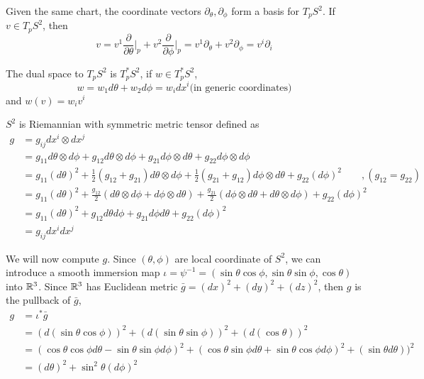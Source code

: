 \documentclass[12pt]{article}
\begin{document}
Given the same chart, the coordinate vectors $\partial_\theta, \partial_\phi$ form a basis for $T_pS^2$. If $v \in T_pS^2$, then  $$v = v^1 \frac{\partial}{\partial \theta}\bigg\rvert_p + v^2 \frac{\partial}{\partial \phi}\bigg\rvert_p = v^1\partial_\theta + v^2 \partial_\phi = v^i \partial_i $$

The dual space to $T_pS^2$ is $T^*_pS^2$, if $w \in T^*_pS^2$, $$w = w_1 d\theta + w_2 d\phi = w_i dx^i \text{(in generic coordinates)}$$
and $w(v) = w_i v^i$

$S^2$ is Riemannian with symmetric metric tensor defined as 
$$
\begin{aligned}
	g &= g_{ij}dx^i \otimes dx^j  \\
	  &= g_{11}d\theta\otimes d\phi + g_{12}d\theta \otimes d\phi + g_{21}d\phi \otimes d\theta + g_{22} d\phi \otimes d\phi \\
	  &= g_{11}(d\theta)^2 + \frac{1}{2}(g_{12} + g_{21}) d\theta \otimes d\phi +  \frac{1}{2}(g_{21} + g_{12})  d\phi\otimes d\theta +  g_{22} (d\phi)^2 \qquad ,(g_{12} = g_{22}) \\
	  &= g_{11}(d\theta)^2 + \frac{g_{12}}{2}(d\theta \otimes d\phi + d\phi\otimes d\theta) + \frac{g_{21}}{2}(d\phi\otimes d\theta + d\theta \otimes d\phi) + g_{22} (d\phi)^2 \\
	  &= g_{11}(d\theta)^2 + g_{12}d\theta d\phi + g_{21}d\phi d\theta + g_{22} (d\phi)^2 \\
	  &= g_{ij}dx^i dx^j
\end{aligned}$$

We will now compute $g$. Since $(\theta, \phi)$ are local coordinate of $S^2$, we can introduce a smooth immersion map $\iota = \psi^{-1} = (\sin\theta \cos\phi, \sin\theta\sin\phi, \cos\theta)$ into $\mathbb{R}^3$. Since $\mathbb{R}^3$ has Euclidean metric $\bar{g} = (dx)^2 + (dy)^2 + (dz)^2$, then $g$ is the pullback of $\bar{g}$,
$$\begin{aligned} 
	g &= \iota^*\bar{g} \\
	  &= (d(\sin\theta \cos\phi))^2 + (d(\sin\theta\sin\phi))^2 + (d(\cos\theta))^2\\
	  &= (\cos\theta \cos\phi d\theta - \sin\theta \sin\phi d\phi)^2 + (\cos\theta\sin\phi d\theta + \sin\theta\cos\phi d\phi)^2 + (\sin\theta d\theta))^2\\
	  &= (d\theta)^2 + \sin^2\theta (d\phi)^2
\end{aligned} 
$$
\end{document}
